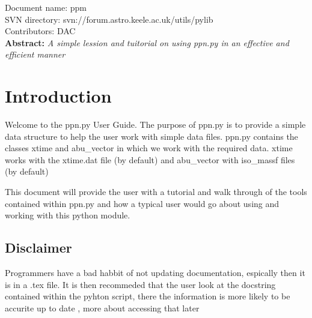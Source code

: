 \renewcommand{\ndoctitle}{ppn.py: Simple ppn Data Structure} 
\renewcommand{\ndocname}{ppm}                      
\renewcommand{\svndir}{svn://forum.astro.keele.ac.uk/utils/pylib}  
\renewcommand{\ndoccontribs}{DAC}



Document name: \ndocname \\
SVN directory: \svndir\\
Contributors: \ndoccontribs\\



{  \textbf{Abstract:} \slshape
A simple lession and tuitorial on using ppn.py in an effective and efficient manner
}

\section{Introduction}
Welcome to the ppn.py User Guide.  The purpose of ppn.py is
to provide a simple data structure to help the user work with simple data files. 
ppn.py contains the classes xtime and abu\_vector in which we work with the required data.
xtime works with the xtime.dat file (by default) and abu\_vector with iso\_massf files (by default)

This document will provide the user with a 
tutorial and walk through of the tools contained within ppn.py and
how a typical user would go about using and working with this python module.

\subsection{Disclaimer}
Programmers have a bad habbit of not updating documentation, espically then it is in  a .tex file.
It is then recommeded that the user look at the docstring contained within the pyhton script, there the information is more likely to be accurite up to date
, more about accessing that later
